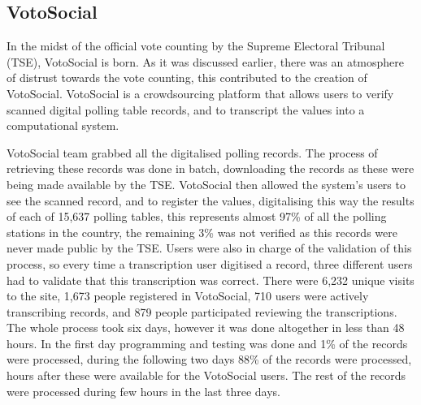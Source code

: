 \documentclass[letterpaper,10pt]{article}
\begin{document}
\subsection{VotoSocial}

In the midst of the official vote counting by the Supreme Electoral Tribunal (TSE), VotoSocial is born. As it was discussed earlier, there was an atmosphere of distrust towards the vote counting, this contributed to the creation of VotoSocial. VotoSocial is a crowdsourcing platform that allows users to verify scanned digital polling table records, and to transcript the values into a computational system. 

VotoSocial team grabbed all the digitalised polling records. The process of retrieving these records was done in batch, downloading the records as these were being made available by the TSE. VotoSocial then allowed the system's users to see the scanned record, and to register the values, digitalising this way the results of each of 15,637 polling tables, this represents almost 97\% of all the polling stations in the country, the remaining 3\% was not verified as this records were never made public by the TSE. Users were also in charge of the validation of this process, so every time a transcription user digitised a record, three different users had to validate that this transcription was correct. There were 6,232 unique visits to the site, 1,673 people registered in VotoSocial, 710 users were actively transcribing records, and 879 people participated reviewing the transcriptions. The whole process took six days, however it was done altogether in less than 48 hours. In the first day programming and testing was done and 1\% of the records were processed, during the following two days 88\% of the records were processed, hours after these were available for the VotoSocial users. The rest of the records were processed during few hours in the last three days.
\end{document}

